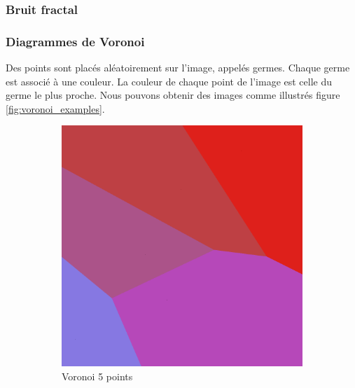 \documentclass{article}
\begin{document}
\subsubsection{Bruit fractal}

\subsubsection{Diagrammes de Voronoi}

Des points sont placés aléatoirement sur l'image, appelés germes. Chaque germe est associé à une couleur. La couleur de chaque point de l'image est celle du germe le plus proche. Nous pouvons obtenir des images comme illustrés figure \ref{fig:voronoi_examples}.

\begin{figure}[h]
    \centering
    \begin{subfigure}{0.3\textwidth}
        \includegraphics[width=\textwidth]{voronoi_5.png}
        \caption{Voronoi 5 points}
        \label{fig:voronoi_5}
    \end{subfigure}
    \begin{subfigure}{0.3\textwidth}

\end{subfigure}
\end{figure}
\end{document}
